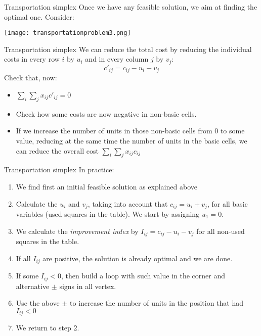 \documentclass{beamer}
\begin{document}
\begin{frame}{Transportation simplex}
  Once we have any feasible solution, we aim at finding the optimal one. Consider:
  \begin{center}
    \texttt{[image: transportationproblem3.png]}
  \end{center}

\end{frame}

\begin{frame}{Transportation simplex}
  We can reduce the total cost by reducing the individual costs in every row $i$ by $u_i$ and in every column $j$ by $v_j$:
  \[c'_{ij}=c_{ij}-u_i-v_j\]
  Check that, now:
  \begin{itemize}
    \item $\sum_i \sum_j x_{ij} c'_{ij}=0$
    \item Check how some costs are now negative in non-basic cells. 
    \item If we increase the number of units in those non-basic cells from 0 to some value, reducing at the same time the number of units in the basic cells, we can reduce the overall cost $\sum_i \sum_j x_{ij} c_{ij}$
  \end{itemize} 

\end{frame}

\begin{frame}{Transportation simplex}
In practice:
\begin{enumerate}
  \item We find first an initial feasible solution as explained above
  \item Calculate the $u_i$ and $v_j$, taking into account that $c_{ij}=u_i+v_j$, for all basic variables (used squares in the table). We start by assigning $u_1=0$.
  \item We calculate the {\em improvement index} by $I_{ij}=c_{ij}-u_i-v_j$ for all non-used squares in the table.
  \item If all $I_{ij}$ are positive, the solution is already optimal and we are done.
  \item If some $I_{ij}<0$, then build a loop with such value in the corner and alternative $\pm$ signs in all vertex. 
  \item Use the above $\pm$ to increase the number of units in the position that had $I_{ij}<0$
  \item We return to step 2.
\end{enumerate}
\end{frame}
\end{document}
